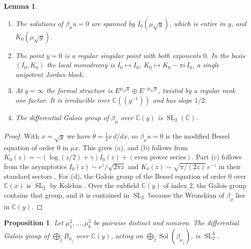 \documentclass[11pt,a4paper]{article}
\newtheorem{proposition}[theorem]{Proposition}
\newtheorem{lemma}[theorem]{Lemma}
\theoremstyle{definition}
\theoremstyle{remark}
\numberwithin{equation}{section}
\newcommand{\C}{\mathbb{C}}
\DeclareMathOperator{\Sol}{Sol}
\DeclareMathOperator{\SL}{SL}
\begin{document}
\begin{lemma}\label{bo:lem:bessel}
\begin{enumerate}
\item[(a)] The solutions of $\beta_\mu u=0$ are spanned by $I_0(\mu\sqrt y)$, which is entire in $y$, and $K_0(\mu\sqrt y)$.
\item[(b)] The point $y=0$ is a regular singular point with both exponents $0$. In the basis $(I_0,K_0)$ the local monodromy is $I_0\mapsto I_0$, $K_0\mapsto K_0-\pi i\,I_0$, a single unipotent Jordan block.
\item[(c)] At $y=\infty$ the formal structure is $E^{\mu\sqrt y}\oplus E^{-\mu\sqrt y}$, twisted by a regular rank one factor. It is irreducible over $\C((y^{-1}))$ and has slope $1/2$.
\item[(d)] The differential Galois group of $\beta_\mu$ over $\C(y)$ is $\SL_2(\C)$.
\end{enumerate}
\end{lemma}

\begin{proof}
With $x=\sqrt y$ we have $\theta=\tfrac12x\,d/dx$, so $\beta_\mu u=0$ is the modified Bessel equation of order $0$ in $\mu x$. This gives (a), and (b) follows from $K_0(z)=-(\log(z/2)+\gamma)I_0(z)+(\text{even power series})$. Part (c) follows from the asymptotics $I_0(z)\sim e^z/\sqrt{2\pi z}$ and $K_0(z)\sim\sqrt{\pi/(2z)}\,e^{-z}$ in their standard sectors \cite[\S10.40(i), (10.40.1)--(10.40.2)]{DLMF}. For (d), the Galois group of the Bessel equation of order $0$ over $\C(x)$ is $\SL_2$ by Kolchin \cite{Kol68}. Over the subfield $\C(y)$ of index $2$, the Galois group contains that group, and it is contained in $\SL_2$ because the Wronskian of $\beta_\mu$ lies in $\C(y)$.
\end{proof}

\begin{proposition}\label{bo:prop:galois}
Let $\mu_1^2,\dots,\mu_k^2$ be pairwise distinct and nonzero. The differential Galois group of $\bigoplus_jB_{\mu_j}$ over $\C(y)$, acting on $\bigoplus_j\Sol(\beta_{\mu_j})$, is $\SL_2^k$.
\end{proposition}
\end{document}
